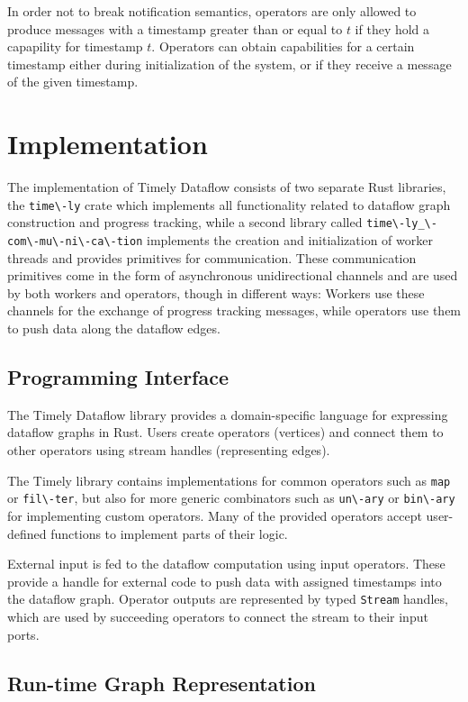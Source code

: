 In order not to break notification semantics, operators are only allowed to
produce messages with a timestamp greater than or equal to $t$ if they hold a
capapility for timestamp $t$. Operators can obtain capabilities for a certain
timestamp either during initialization of the system, or if they receive a
message of the given timestamp.

\section{Implementation}

The implementation of Timely Dataflow consists of two separate Rust libraries,
the \lstinline{time\-ly} crate which implements all functionality related to
dataflow graph construction and progress tracking, while a second library
called \lstinline{time\-ly_\-com\-mu\-ni\-ca\-tion} implements the creation and
initialization of worker threads and provides primitives for communication.
These communication primitives come in the form of asynchronous unidirectional
channels and are used by both workers and operators, though in different ways:
Workers use these channels for the exchange of progress tracking messages, while
operators use them to push data along the dataflow edges.

\subsection{Programming Interface}

The Timely Dataflow library provides a domain-specific language for expressing
dataflow graphs in Rust. Users create operators (vertices) and connect
them to other operators using stream handles (representing edges).

The Timely library contains implementations for common operators such as
\lstinline{map} or \lstinline{fil\-ter}, but also for more generic combinators
such as \lstinline{un\-ary} or \lstinline{bin\-ary} for implementing custom operators.
Many of the provided operators accept user-defined functions to implement
parts of their logic.

External input is fed to the dataflow computation using input operators. These
provide a handle for external code to push data with assigned timestamps into
the dataflow graph. Operator outputs are represented
by typed \lstinline{Stream} handles, which are used by succeeding operators
to connect the stream to their input ports.

\subsection{Run-time Graph Representation} \label{sec:runtime-graph}

